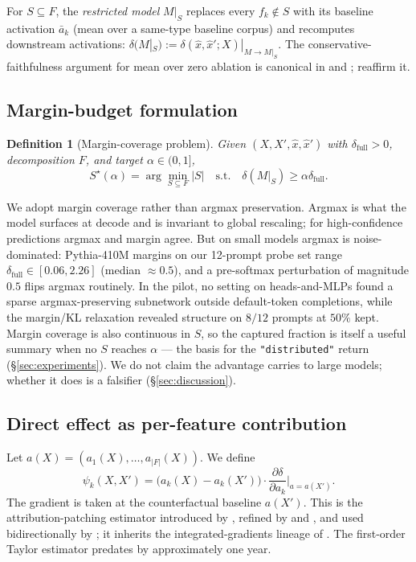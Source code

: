 \documentclass[10pt]{article}
\newtheorem{definition}{Definition}[section]
\begin{document}
For $S \subseteq F$, the \emph{restricted model} $M|_S$ replaces every $f_k \notin S$ with its baseline activation $\bar a_k$ (mean over a same-type baseline corpus) and recomputes downstream activations: $\delta(M|_S) := \delta(\hat x, \hat x'; X)|_{M \to M|_S}$. The conservative-faithfulness argument for mean over zero ablation is canonical in \citet{wang2022interpretability} and \citet{zhang2024nanda}; \citet{heimersheim2024patching} reaffirm it.

\subsection{Margin-budget formulation}

\begin{definition}[Margin-coverage problem]
\label{def:margin-coverage}
Given $(X, X', \hat x, \hat x')$ with $\delta_{\text{full}} > 0$, decomposition $F$, and target $\alpha \in (0, 1]$,
\[
S^\star(\alpha) = \arg\min_{S \subseteq F} |S| \quad \text{s.t.} \quad \delta(M|_S) \geq \alpha \delta_{\text{full}}.
\]
\end{definition}

We adopt margin coverage rather than argmax preservation. Argmax is what the model surfaces at decode and is invariant to global rescaling; for high-confidence predictions argmax and margin agree. But on small models argmax is noise-dominated: Pythia-410M margins on our 12-prompt probe set range $\delta_{\text{full}} \in [0.06, 2.26]$ (median $\approx 0.5$), and a pre-softmax perturbation of magnitude $0.5$ flips argmax routinely. In the pilot, no setting on heads-and-MLPs found a sparse argmax-preserving subnetwork outside default-token completions, while the margin/KL relaxation revealed structure on $8/12$ prompts at $50\%$ kept. Margin coverage is also continuous in $S$, so the captured fraction is itself a useful summary when no $S$ reaches $\alpha$ --- the basis for the \texttt{"distributed"} return (\S\ref{sec:experiments}). We do not claim the advantage carries to large models; whether it does is a falsifier (\S\ref{sec:discussion}).

\subsection{Direct effect as per-feature contribution}

Let $a(X) = (a_1(X), \dots, a_{|F|}(X))$. We define
\[
\psi_k(X, X') = \big(a_k(X) - a_k(X')\big) \cdot \frac{\partial \delta}{\partial a_k}\bigg|_{a = a(X')}.
\]
The gradient is taken at the counterfactual baseline $a(X')$. This is the attribution-patching estimator introduced by \citet{nanda2023attribution}, refined by \citet{syed2024attribution} and \citet{kramar2024atp}, and used bidirectionally by \citet{hanna2024faithfulness}; it inherits the integrated-gradients lineage of \citet{sundararajan2017axiomatic}. The first-order Taylor estimator predates \citet{syed2024attribution} by approximately one year.
\end{document}
